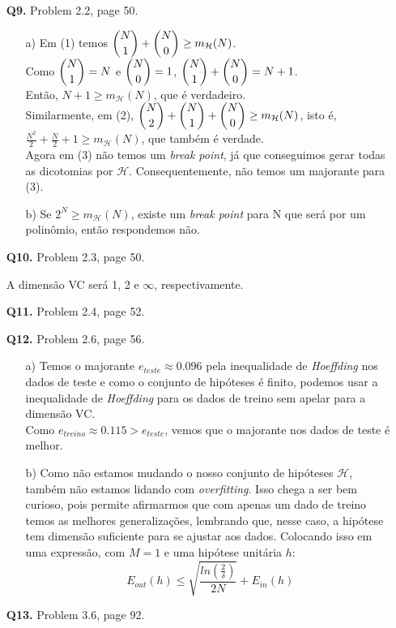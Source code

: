 \documentclass[12pt]{article}
\begin{document}
\begin{enumerate}
\item [\textbf{Q9.}] Problem 2.2, page 50.
	\begin{addmargin}[1em]{2em}
		\begin{itemize}
			\item[a)] Em (1) temos $\dbinom{N}{1} + \dbinom{N}{0} \geq m_{\mathcal{H}}(N)$.\\
			Como $\dbinom{N}{1} = N$ e $\dbinom{N}{0} = 1$, $\dbinom{N}{1} + \dbinom{N}{0} = N+1$.\\
			Então, $N + 1 \geq m_{\mathcal{H}}(N)$, que é verdadeiro.\\
			Similarmente, em (2), $\dbinom{N}{2} + \dbinom{N}{1} + \dbinom{N}{0} \geq m_{\mathcal{H}}(N)$, isto é,\\ 
			$\frac{N^2}{2} + \frac{N}{2} + 1 \geq m_{\mathcal{H}}(N)$, que também é verdade.\\
			Agora  em (3) não temos um \textit{break point}, já que conseguimos gerar todas as dicotomias por $\mathcal{H}$. Consequentemente,  não temos um majorante para (3).
			\item[b)] Se $2^N \geq m_{\mathcal{H}}(N)$, existe um \textit{break point} para N que será por um polinômio, então respondemos não.
		\end{itemize}
	\end{addmargin}

\pagebreak	
	
\item [\textbf{Q10.}] Problem 2.3, page 50.
	\begin{addmargin}[1em]{2em}
		A dimensão VC será 1, 2 e $\infty$, respectivamente.
	\end{addmargin}
\item [\textbf{Q11.}] Problem 2.4, page 52.

\item [\textbf{Q12.}] Problem 2.6, page 56.
	\begin{itemize}
		\item[a)] Temos o majorante $e_{teste} \approx 0.096$ pela inequalidade de \textit{Hoeffding} nos dados de teste e como o conjunto de hipóteses é finito, podemos usar a inequalidade de \textit{Hoeffding} para os dados de treino sem apelar para a dimensão VC.\\
		Como $e_{treino} \approx 0.115 > e_{teste}$, vemos que o majorante nos dados de teste é melhor.
		\item[b)] Como não estamos mudando o nosso conjunto de hipóteses $\mathcal{H}$, também não estamos lidando com \textit{overfitting}. Isso chega a ser bem curioso, pois permite afirmarmos que com apenas um dado de treino temos as melhores generalizações, lembrando que, nesse caso, a  hipótese tem dimensão suficiente para se ajustar aos dados. Colocando isso em uma expressão, com $M = 1$ e uma hipótese unitária $h$: \[E_{out}(h) \leq \sqrt{\frac{ln \left( \frac{2}{\delta} \right)}{2N}} + E_{in}(h)\]
	\end{itemize}
\item [\textbf{Q13.}] Problem 3.6, page 92.


\end{enumerate}
\end{document}
